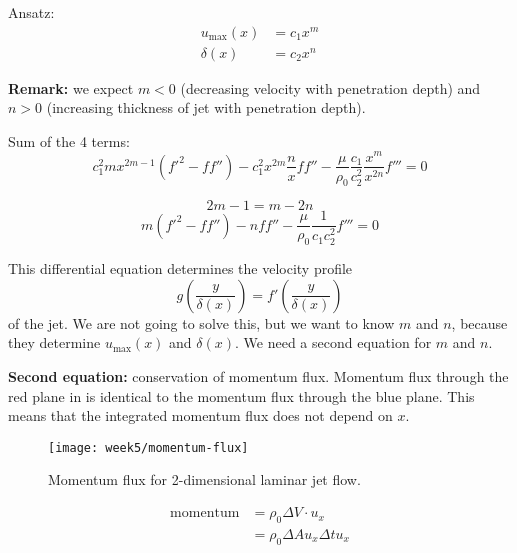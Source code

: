 Ansatz:
\begin{align}
u_\mathrm{max}(x) &= c_1x^m\\
\delta(x) &= c_2 x^n
\end{align}

\begin{framed}
\textbf{Remark:} we expect $m<0$ (decreasing velocity with penetration depth) and $n>0$ (increasing thickness of jet with penetration depth).
\end{framed}

Sum of the 4 terms:
\begin{equation}
c_1^2mx^{2m-1}(f'^2-ff'')-c_1^2x^{2m}\frac{n}{x}ff'' - \frac{\mu}{\rho_0}\frac{c_1}{c_2^2}\frac{x^m}{x^{2n}}f'''=0
\end{equation}

\begin{framed}
\begin{equation}
2m-1 = m-2n
\end{equation}
\begin{equation}
m(f'^2-ff'')-nff''-\frac{\mu}{\rho_0}\frac{1}{c_1c_2^2}f'''=0
\end{equation}
\end{framed}

This differential equation determines the velocity profile
\begin{equation}
g\left(\frac{y}{\delta(x)}\right)=f'\left(\frac{y}{\delta(x)}\right)
\end{equation}
of the jet. We are not going to solve this, but we want to know $m$ and $n$, because they determine $u_\mathrm{max}(x)$ and $\delta(x)$. We need a second equation for $m$ and $n$.

\textbf{Second equation:} conservation of momentum flux.
Momentum flux through the red plane in  is identical to the momentum flux through the blue plane. This means that the integrated momentum flux does not depend on $x$.
\begin{figure}[!h]
    \centering
    \texttt{[image: week5/momentum-flux]}\\
    \caption{Momentum flux for 2-dimensional laminar jet flow.}
    \label{fig:momentum-flux}
\end{figure}

\begin{align}
\mathrm{momentum} & =\rho_0\Delta V\cdot u_x\\
&= \rho_0\Delta Au_x\Delta tu_x
\end{align}

